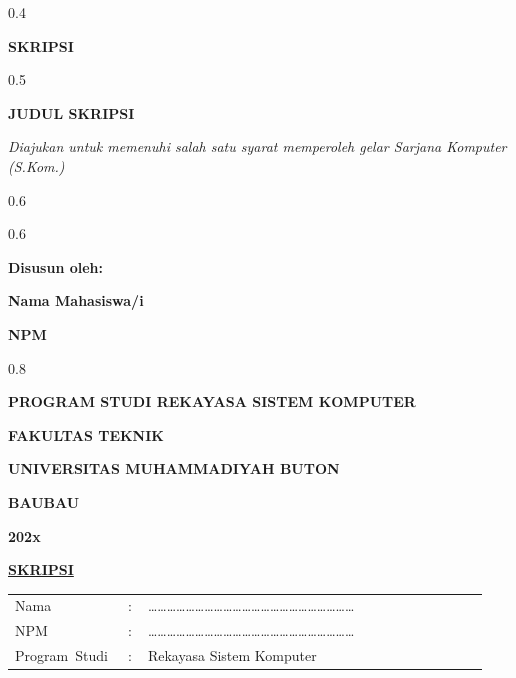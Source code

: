 \thispagestyle{empty}
\begin{ruang}{0.4}\end{ruang}
\begin{sampulbesar}
\textbf{SKRIPSI}
\end{sampulbesar}
\begin{ruang}{0.5}\end{ruang}
\begin{sampulbesar}
\textbf{JUDUL SKRIPSI}
\end{sampulbesar}
\begin{sampulsedang}
\textit{Diajukan untuk memenuhi salah satu syarat memperoleh gelar Sarjana Komputer (S.Kom.)}
\end{sampulsedang}
\begin{ruang}{0.6}\end{ruang}
\begin{tengah}
\logo{4.5cm}
\end{tengah}
\begin{ruang}{0.6}\end{ruang}
\begin{sampulsedang}
\textbf{Disusun oleh:}

\textbf{Nama Mahasiswa/i}

\textbf{NPM}
\end{sampulsedang}
\begin{ruang}{0.8}\end{ruang}
\begin{sampulsedang}
\textbf{PROGRAM STUDI REKAYASA SISTEM KOMPUTER}

\textbf{FAKULTAS TEKNIK}

\textbf{UNIVERSITAS MUHAMMADIYAH BUTON}

\textbf{BAUBAU}

\textbf{202x}
\end{sampulsedang}
\begin{halamanbaru}\end{halamanbaru}

\thispagestyle{empty}
\begin{tengah}
\textbf{\underline{SKRIPSI}}
\end{tengah}

\begin{tanpagaris}
\begin{longtable}{@{}p{0.22\linewidth}p{0.04\linewidth}p{0.68\linewidth}@{}}
Nama & : & ………………………………………………………… \\[6pt]
NPM & : & ………………………………………………………… \\[6pt]
\mbox{Program Studi} & : & Rekayasa Sistem Komputer \\
\end{longtable}
\end{tanpagaris}

